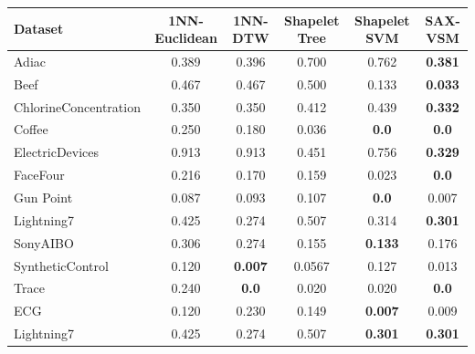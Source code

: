 \documentclass{llncs}
\begin{document}
{\scriptsize
\begin{tabular}[h]{  p{11em} | c | c | c | c |  c  }
\hline
Dataset           & 1NN-Euclidean  & 1NN-DTW       & Shapelet Tree & Shapelet SVM & SAX-VSM \\
\hline
Adiac             & 0.389   & 0.396           & 0.700        & 0.762        & \textbf{0.381}\\
Beef              & 0.467   & 0.467           & 0.500        & 0.133        & \textbf{0.033}\\
ChlorineConcentration  & 0.350 & 0.350        & 0.412        & 0.439        & \textbf{0.332} \\
Coffee            & 0.250   & 0.180           & 0.036    & \textbf{0.0}     & \textbf{0.0} \\
ElectricDevices   & 0.913   & 0.913           & 0.451    & 0.756            & \textbf{0.329} \\
FaceFour          & 0.216   & 0.170           & 0.159    & 0.023            & \textbf{0.0} \\
Gun Point         & 0.087   & 0.093           & 0.107    & \textbf{0.0}     & 0.007 \\
Lightning7        & 0.425   & 0.274           & 0.507    & 0.314            & \textbf{0.301} \\
SonyAIBO          & 0.306   & 0.274           & 0.155    & \textbf{0.133}   & 0.176 \\
SyntheticControl  & 0.120   & \textbf{0.007}  & 0.0567   & 0.127        & 0.013 \\
Trace             & 0.240   & \textbf{0.0}    & 0.020     & 0.020         & \textbf{0.0} \\
ECG               & 0.120   & 0.230           & 0.149    & \textbf{0.007}   & 0.009 \\
Lightning7        & 0.425   & 0.274    & 0.507    & \textbf{0.301}  & \textbf{0.301} \\
\hline
\end{tabular}
}
\end{document}
